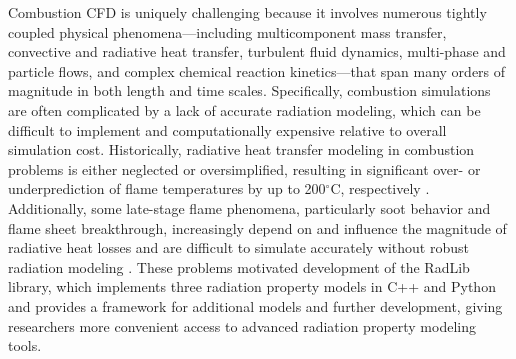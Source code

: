 \documentclass[preprint,12pt]{elsarticle}
\begin{document}
Combustion CFD is uniquely challenging because it involves numerous tightly coupled physical phenomena---including multicomponent mass transfer, convective and radiative heat transfer, turbulent fluid dynamics, multi-phase and particle flows, and complex chemical reaction kinetics---that span many orders of magnitude in both length and time scales. Specifically, combustion simulations are often complicated by a lack of accurate radiation modeling, which can be difficult to implement and computationally expensive relative to overall simulation cost. Historically, radiative heat transfer modeling in combustion problems is either neglected or oversimplified, resulting in significant over- or underprediction of flame temperatures by up to 200$^{\circ}$C, respectively \citep{Modest_2016}. Additionally, some late-stage flame phenomena, particularly soot behavior and flame sheet breakthrough, increasingly depend on and influence the magnitude of radiative heat losses and are difficult to simulate accurately without robust radiation modeling \cite{Modest_2013}. These problems motivated development of the RadLib library, which implements three radiation property models in C++ and Python and provides a framework for additional models and further development, giving researchers more convenient access to advanced radiation property modeling tools. 
%
\end{document}
